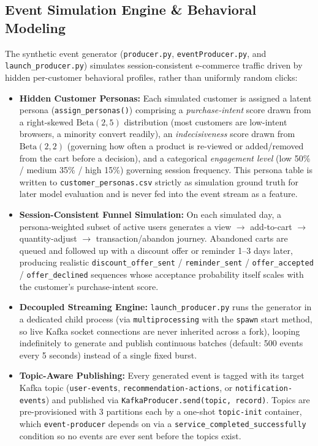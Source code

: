 \documentclass[11pt,a4paper]{article}
\begin{document}
\subsection{Event Simulation Engine \& Behavioral Modeling}
The synthetic event generator (\texttt{producer.py}, \texttt{eventProducer.py}, and \texttt{launch\_producer.py}) simulates session-consistent e-commerce traffic driven by hidden per-customer behavioral profiles, rather than uniformly random clicks:
\begin{itemize}
    \item \textbf{Hidden Customer Personas:} Each simulated customer is assigned a latent persona (\texttt{assign\_personas()}) comprising a \emph{purchase-intent} score drawn from a right-skewed $\text{Beta}(2,5)$ distribution (most customers are low-intent browsers, a minority convert readily), an \emph{indecisiveness} score drawn from $\text{Beta}(2,2)$ (governing how often a product is re-viewed or added/removed from the cart before a decision), and a categorical \emph{engagement level} (low 50\% / medium 35\% / high 15\%) governing session frequency. This persona table is written to \texttt{customer\_personas.csv} strictly as simulation ground truth for later model evaluation and is never fed into the event stream as a feature.
    \item \textbf{Session-Consistent Funnel Simulation:} On each simulated day, a persona-weighted subset of active users generates a view $\rightarrow$ add-to-cart $\rightarrow$ quantity-adjust $\rightarrow$ transaction/abandon journey. Abandoned carts are queued and followed up with a discount offer or reminder 1--3 days later, producing realistic \texttt{discount\_offer\_sent} / \texttt{reminder\_sent} / \texttt{offer\_accepted} / \texttt{offer\_declined} sequences whose acceptance probability itself scales with the customer's purchase-intent score.
    \item \textbf{Decoupled Streaming Engine:} \texttt{launch\_producer.py} runs the generator in a dedicated child process (via \texttt{multiprocessing} with the \texttt{spawn} start method, so live Kafka socket connections are never inherited across a fork), looping indefinitely to generate and publish continuous batches (default: 500 events every 5 seconds) instead of a single fixed burst.
    \item \textbf{Topic-Aware Publishing:} Every generated event is tagged with its target Kafka topic (\texttt{user-events}, \texttt{recommendation-actions}, or \texttt{notification-events}) and published via \texttt{KafkaProducer.send(topic, record)}. Topics are pre-provisioned with 3 partitions each by a one-shot \texttt{topic-init} container, which \texttt{event-producer} depends on via a \texttt{service\_completed\_successfully} condition so no events are ever sent before the topics exist.
\end{itemize}
\end{document}
